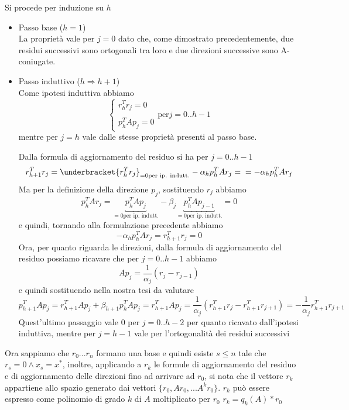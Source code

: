 \begin{thproof}

Si procede per induzione su $h$
\begin{itemize}
\item Passo base ($h=1$)\\ La proprietà vale per $j=0$ dato che, come
dimostrato precedentemente, due residui successivi sono ortogonali tra
loro e due direzioni successive sono A-coniugate.
\item Passo induttivo ($h \Rightarrow h+1$) \\ Come ipotesi induttiva
abbiamo
$$\left\{
\begin{array}{ll} r_{h}^{T} r_{j} = 0\\ \\ p_{h}^{T} A p_{j} = 0
\end{array} \right.  \text{per} j=0..h-1
$$
mentre per $j=h$ vale dalle stesse proprietà presenti al passo base.

Dalla formula di aggiornamento del residuo si ha per $j=0..h-1$
$$r_{h+1}^{T}r_{j} =\underbracket{ r_{h}^{T}r_{j}}_{= 0 \text {per ip. indutt.}} - \alpha_{h}p_{h}^{T}Ar_{j}=   \\
=-\alpha_{h}p_{h}^{T}Ar_{j}
$$
Ma per la definizione della direzione $p_{j}$, sostituendo $r_{j}$ abbiamo
$$
p_{h}^{T}Ar_{j}=\underbracket{p_{h}^{T}Ap_{j}}_{=0 \text{per
ip. indutt.}} - \beta_{j}\underbracket{p_{h}^{T}Ap_{j-1}}_{=0
\text{per ip. indutt.}} = 0
$$
e quindi, tornando alla formulazione precedente abbiamo
$$
-\alpha_{h}p_{h}^{T}Ar_{j}=r_{h+1}^{T} r_{j} = 0
$$
Ora, per quanto riguarda le direzioni, dalla formula di aggiornamento del residuo possiamo ricavare che per $j=0..h-1$
abbiamo
$$Ap_{j}=\frac{1}{\alpha_{j}}(r_{j} - r_{j-1})$$
e quindi sostituendo nella nostra tesi da valutare
$$p_{h+1}^{T}Ap_{j}=r_{h+1}^{T}Ap_{j}+\beta_{h+1}p_{h}^{T}Ap_{j}=r_{h+1}^{T}Ap_{j}=
\frac{1}{\alpha_{j}}(r_{h+1}^{T}r_{j}-r_{h+1}^{T}r_{j+1})=-\frac{1}{\alpha_{j}}r_{h+1}^{T}r_{j+1}$$
Quest'ultimo passaggio vale 0 per $j=0..h-2$ per quanto ricavato
dall'ipotesi induttiva, mentre per $j=h-1$ vale per l'ortogonalità dei
residui successivi
\end{itemize}
\end{thproof} Ora sappiamo che $r_{0}... r_{n}$ formano una base e
quindi esiste $s \leq n$ tale che $r_{s} = 0 \wedge x_{s} = x^{*} $,
inoltre, applicando a $r_{k}$ le formule di aggiornamento del residuo
e di aggiornamento delle direzioni fino ad arrivare ad $r_{0}$, si
nota che il vettore $r_{k}$ appartiene allo spazio generato dai
vettori $\{ r_{0}, Ar_{0}, ... A^{k}r_{0} \}$.  $r_{k}$ può essere
espresso come polinomio di grado $k$ di $A$ moltiplicato per $r_{0}$
$r_{k}=q_{k}(A)*r_{0}$


